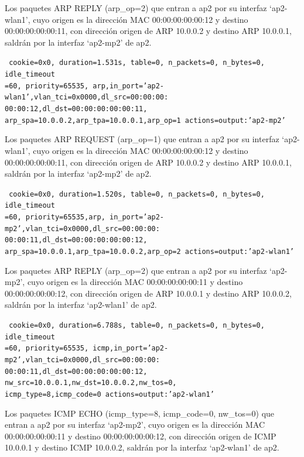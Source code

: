 \documentclass[a4paper,12pt,twoside,spanish]{book}
\begin{document}
Los paquetes ARP REPLY (arp\_op=2) que entran a ap2 por su interfaz ‘ap2-wlan1’, cuyo origen es la dirección MAC 00:00:00:00:00:12 y destino 00:00:00:00:00:11, con dirección origen de ARP 10.0.0.2 y destino ARP 10.0.0.1, saldrán por la interfaz ‘ap2-mp2’ de ap2.\par 

\noindent\texttt{
	cookie=0x0, duration=1.531s, table=0, n\_packets=0, n\_bytes=0, idle\_timeout\\
	=60, priority=65535,
	arp,in\_port='ap2-wlan1',vlan\_tci=0x0000,dl\_src=00:00:00:\\
	00:00:12,dl\_dst=00:00:00:00:00:11,
	arp\_spa=10.0.0.2,arp\_tpa=10.0.0.1,arp\_op=1 actions=output:'ap2-mp2'
}

Los paquetes ARP REQUEST (arp\_op=1) que entran a ap2 por su interfaz ‘ap2-wlan1’, cuyo origen es la dirección MAC 00:00:00:00:00:12 y destino 00:00:00:00:00:11, con dirección origen de ARP 10.0.0.2 y destino ARP 10.0.0.1, saldrán por la interfaz ‘ap2-mp2’ de ap2.\par 

\noindent\texttt{
	cookie=0x0, duration=1.520s, table=0, n\_packets=0, n\_bytes=0, idle\_timeout\\
	=60, priority=65535,arp,
	in\_port='ap2-mp2',vlan\_tci=0x0000,dl\_src=00:00:00:\\
	00:00:11,dl\_dst=00:00:00:00:00:12,
	arp\_spa=10.0.0.1,arp\_tpa=10.0.0.2,arp\_op=2 actions=output:'ap2-wlan1'
}

Los paquetes ARP REPLY (arp\_op=2) que entran a ap2 por su interfaz ‘ap2-mp2’, cuyo origen es la dirección MAC 00:00:00:00:00:11 y destino 00:00:00:00:00:12, con dirección origen de ARP 10.0.0.1 y destino ARP 10.0.0.2, saldrán por la interfaz ‘ap2-wlan1’ de ap2.\par 

\noindent\texttt{
	cookie=0x0, duration=6.788s, table=0, n\_packets=0, n\_bytes=0, idle\_timeout\\
	=60, priority=65535,
	icmp,in\_port='ap2-mp2',vlan\_tci=0x0000,dl\_src=00:00:00:\\
	00:00:11,dl\_dst=00:00:00:00:00:12,
	nw\_src=10.0.0.1,nw\_dst=10.0.0.2,nw\_tos=0,\\
	icmp\_type=8,icmp\_code=0 actions=output:'ap2-wlan1'
}

Los paquetes ICMP ECHO (icmp\_type=8, icmp\_code=0, nw\_tos=0) que entran a ap2 por su interfaz ‘ap2-mp2’, cuyo origen es la dirección MAC 00:00:00:00:00:11 y destino 00:00:00:00:00:12, con dirección origen de ICMP 10.0.0.1 y destino ICMP 10.0.0.2, saldrán por la interfaz ‘ap2-wlan1’ de ap2.\par 
\end{document}
